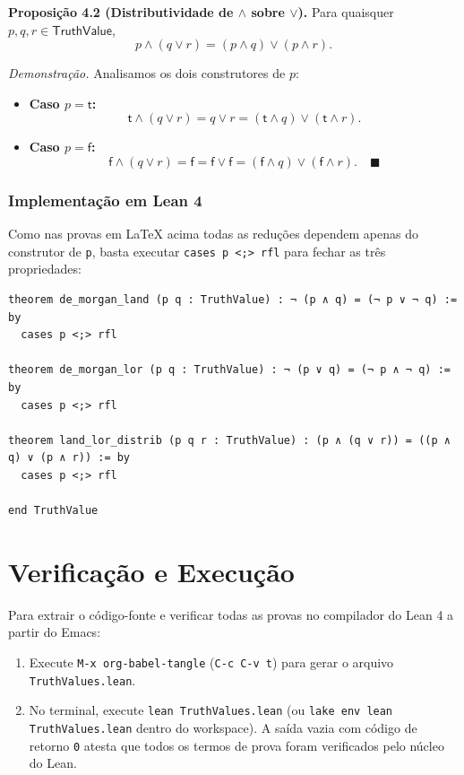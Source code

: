 \documentclass[11pt,a4paper]{scrartcl}
\begin{document}
\textbf{Proposição 4.2 (Distributividade de \(\land\) sobre \(\lor\)).} Para quaisquer \(p, q, r \in \mathsf{TruthValue}\),
$$p \land (q \lor r) = (p \land q) \lor (p \land r).$$

\emph{Demonstração.} Analisamos os dois construtores de \(p\):
\begin{itemize}
\item \textbf{Caso \(p = \mathsf{t}\):}
$$\mathsf{t} \land (q \lor r) = q \lor r = (\mathsf{t} \land q) \lor (\mathsf{t} \land r).$$
\item \textbf{Caso \(p = \mathsf{f}\):}
$$\mathsf{f} \land (q \lor r) = \mathsf{f} = \mathsf{f} \lor \mathsf{f} = (\mathsf{f} \land q) \lor (\mathsf{f} \land r). \quad \blacksquare$$
\end{itemize}
\subsubsection{Implementação em Lean 4}
\label{sec:org53f2aa0}
Como nas provas em \LaTeX{} acima todas as reduções dependem apenas do construtor de \texttt{p}, basta executar \texttt{cases p <;> rfl} para fechar as três propriedades:

\begin{lstlisting}[language=lean4,numbers=none]
theorem de_morgan_land (p q : TruthValue) : ¬ (p ∧ q) = (¬ p ∨ ¬ q) := by
  cases p <;> rfl

theorem de_morgan_lor (p q : TruthValue) : ¬ (p ∨ q) = (¬ p ∧ ¬ q) := by
  cases p <;> rfl

theorem land_lor_distrib (p q r : TruthValue) : (p ∧ (q ∨ r)) = ((p ∧ q) ∨ (p ∧ r)) := by
  cases p <;> rfl

end TruthValue
\end{lstlisting}
\section{Verificação e Execução}
\label{sec:org462c554}
Para extrair o código-fonte e verificar todas as provas no compilador do Lean 4 a partir do Emacs:
\begin{enumerate}
\item Execute \texttt{M-x org-babel-tangle} (\texttt{C-c C-v t}) para gerar o arquivo \texttt{TruthValues.lean}.
\item No terminal, execute \texttt{lean TruthValues.lean} (ou \texttt{lake env lean TruthValues.lean} dentro do workspace). A saída vazia com código de retorno \texttt{0} atesta que todos os termos de prova foram verificados pelo núcleo do Lean.
\end{enumerate}
\end{document}
